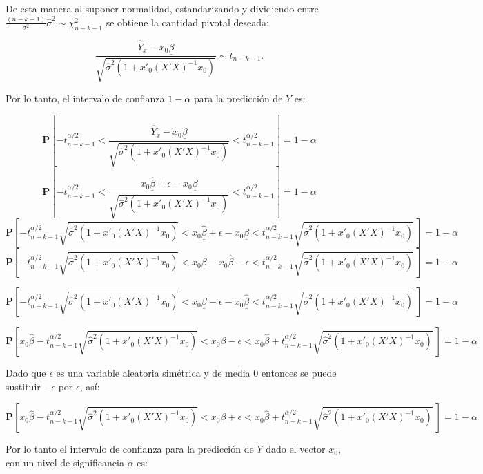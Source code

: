 \documentclass[
  a4paper,
  oneside,
  openany]{book}
\begin{document}
De esta manera al suponer normalidad, estandarizando y dividiendo entre \(\frac{(n-k-1)}{\sigma^2}\hat{\sigma}^2 \sim \chi^2_{n-k-1}\) se obtiene la cantidad pivotal deseada:

\[\frac{\hat{Y}_{x}-x_{0}\underline{\beta}}{\sqrt{\hat{\sigma}^2\left(1+x'_{0}(X'X)^{-1}x_{0}\right)}} \sim t_{n-k-1}.\]

Por lo tanto, el intervalo de confianza \(1-\alpha\) para la predicción de \(Y\) es:

\[\mathbf{P}\left[-t^{\alpha/2}_{n-k-1}<\frac{\hat{Y}_{x}-x_{0}\underline{\beta}}{\sqrt{\hat{\sigma}^2\left(1+x'_{0}(X'X)^{-1}x_{0}\right)}}<t^{\alpha/2}_{n-k-1}\right]=1-\alpha\]
\[\mathbf{P}\left[-t^{\alpha/2}_{n-k-1}<\frac{x_{0}\underline{\hat{\beta}}+\epsilon-x_{0}\underline{\beta}}{\sqrt{\hat{\sigma}^2\left(1+x'_{0}(X'X)^{-1}x_{0}\right)}}<t^{\alpha/2}_{n-k-1}\right]=1-\alpha\]
\[\mathbf{P}\left[-t^{\alpha/2}_{n-k-1}\sqrt{\hat{\sigma}^2\left(1+x'_{0}(X'X)^{-1}x_{0}\right)}<x_{0}\underline{\hat{\beta}}+\epsilon-x_{0}\underline{\beta}<t^{\alpha/2}_{n-k-1}\sqrt{\hat{\sigma}^2\left(1+x'_{0}(X'X)^{-1}x_{0}\right)} \ \right]=1-\alpha\]
\[\mathbf{P}\left[-t^{\alpha/2}_{n-k-1}\sqrt{\hat{\sigma}^2\left(1+x'_{0}(X'X)^{-1}x_{0}\right)}<x_{0}\underline{\beta}-x_{0}\underline{\hat{\beta}}-\epsilon<t^{\alpha/2}_{n-k-1}\sqrt{\hat{\sigma}^2\left(1+x'_{0}(X'X)^{-1}x_{0}\right)} \ \right]=1-\alpha\]

\[\mathbf{P}\left[-t^{\alpha/2}_{n-k-1}\sqrt{\hat{\sigma}^2\left(1+x'_{0}(X'X)^{-1}x_{0}\right)}<x_{0}\underline{\beta}-\epsilon-x_{0}\underline{\hat{\beta}}<t^{\alpha/2}_{n-k-1}\sqrt{\hat{\sigma}^2\left(1+x'_{0}(X'X)^{-1}x_{0}\right)} \ \right]=1-\alpha\]

\[\mathbf{P}\left[x_{0}\underline{\hat{\beta}}-t^{\alpha/2}_{n-k-1}\sqrt{\hat{\sigma}^2\left(1+x'_{0}(X'X)^{-1}x_{0}\right)}<x_{0}\underline{\beta}-\epsilon<x_{0}\underline{\hat{\beta}}+t^{\alpha/2}_{n-k-1}\sqrt{\hat{\sigma}^2\left(1+x'_{0}(X'X)^{-1}x_{0}\right)} \ \right]=1-\alpha\]

Dado que \(\epsilon\) es una variable aleatoria simétrica y de media 0 entonces se puede sustituir \(-\epsilon\) por \(\epsilon\), así:

\[\mathbf{P}\left[x_{0}\underline{\hat{\beta}}-t^{\alpha/2}_{n-k-1}\sqrt{\hat{\sigma}^2\left(1+x'_{0}(X'X)^{-1}x_{0}\right)}<x_{0}\underline{\beta}+\epsilon<x_{0}\underline{\hat{\beta}}+t^{\alpha/2}_{n-k-1}\sqrt{\hat{\sigma}^2\left(1+x'_{0}(X'X)^{-1}x_{0}\right)} \ \right]=1-\alpha\]

Por lo tanto el intervalo de confianza para la predicción de \(Y\) dado el vector \(x_{0}\), con un nivel de significancia \(\alpha\) es:
\end{document}
